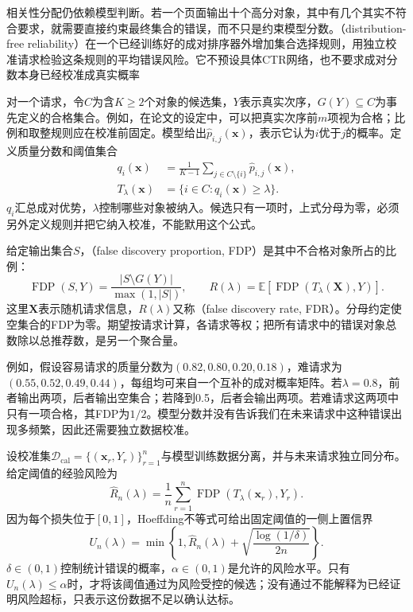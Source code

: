 相关性分配仍依赖模型判断。若一个页面输出十个高分对象，其中有几个其实不符合要求，就需要直接约束最终集合的错误，而不只是约束模型分数。（distribution-free reliability）在一个已经训练好的成对排序器外增加集合选择规则，用独立校准请求检验这条规则的平均错误风险。它不预设具体CTR网络，也不要求成对分数本身已经校准成真实概率

对一个请求，令$C$为含$K\geq2$个对象的候选集，$Y$表示真实次序，$G(Y)\subseteq C$为事先定义的合格集合。例如，在论文的设定中，可以把真实次序前$m$项视为合格；比例和取整规则应在校准前固定。模型给出$\widehat p_{i,j}(\bm{x})$，表示它认为$i$优于$j$的概率。定义质量分数和阈值集合
\begin{equation}
 \begin{aligned}
  q_i(\bm{x})&=\frac{1}{K-1}
           \sum_{j\in C\setminus\{i\}}\widehat p_{i,j}(\bm{x}),\\
  T_\lambda(\bm{x})&=\{i\in C:q_i(\bm{x})\geq\lambda\}.
 \end{aligned}
 \label{eq:rs-risk-set}
\end{equation}
$q_i$汇总成对优势，$\lambda$控制哪些对象被纳入。候选只有一项时，上式分母为零，必须另外定义规则并把它纳入校准，不能默用这个公式。

给定输出集合$S$，（false discovery proportion, FDP）是其中不合格对象所占的比例：
\begin{equation}
 \operatorname{FDP}(S,Y)
 =\frac{|S\setminus G(Y)|}{\max(1,|S|)},
 \qquad
 R(\lambda)=\mathbb{E}\!
  \left[\operatorname{FDP}(T_\lambda(\bm{X}),Y)\right].
 \label{eq:rs-fdp-risk}
\end{equation}
这里$\bm{X}$表示随机请求信息，$R(\lambda)$又称（false discovery rate, FDR）。分母约定使空集合的FDP为零。期望按请求计算，各请求等权；把所有请求中的错误对象总数除以总推荐数，是另一个聚合量。

例如，假设容易请求的质量分数为$(0.82,0.80,0.20,0.18)$，难请求为$(0.55,0.52,0.49,0.44)$，每组均可来自一个互补的成对概率矩阵。若$\lambda=0.8$，前者输出两项，后者输出空集合；若降到0.5，后者会输出两项。若难请求这两项中只有一项合格，其FDP为$1/2$。模型分数并没有告诉我们在未来请求中这种错误出现多频繁，因此还需要独立数据校准。

设校准集$\mathcal{D}_{\mathrm{cal}}=\{(\bm{x}_r,Y_r)\}_{r=1}^{n}$与模型训练数据分离，并与未来请求独立同分布。给定阈值的经验风险为
\[
 \widehat R_n(\lambda)=\frac1n\sum_{r=1}^{n}
   \operatorname{FDP}(T_\lambda(\bm{x}_r),Y_r).
\]
因为每个损失位于$[0,1]$，Hoeffding不等式可给出固定阈值的一侧上置信界
\begin{equation}
 U_n(\lambda)=
 \min\left\{1,\widehat R_n(\lambda)
       +\sqrt{\frac{\log(1/\delta)}{2n}}\right\}.
 \label{eq:rs-risk-upper-bound}
\end{equation}
$\delta\in(0,1)$控制统计错误的概率，$\alpha\in(0,1)$是允许的风险水平。只有$U_n(\lambda)\leq\alpha$时，才将该阈值通过为风险受控的候选；没有通过不能解释为已经证明风险超标，只表示这份数据不足以确认达标。

